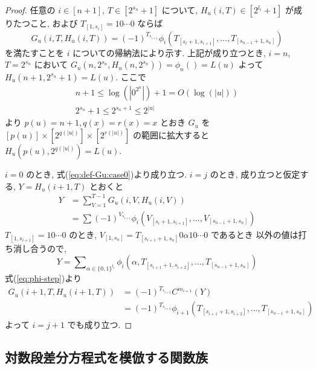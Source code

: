 \begin{proof}
 任意の $i \in [n+1]$, $T \in [2^{s_n}+1]$ について,
 $H_u(i,T) \in [2^{l_i}+1]$ が成りたつこと,
 および $T_{[1,s_i]} = 10 \cdots 0$ ならば
 \begin{equation} \label{eq:subformula}
  G_u(i,T,H_u(i,T)) = (-1)^{T_{s_{i+1}}} 
   \phi_i(T_{[s_i+1, s_{i+1}]}, \dots, T_{[s_{n-1}+1, s_n]})
 \end{equation}
 を満たすことを $i$ についての帰納法により示す.
 上記が成り立つとき,
 $i=n$, $T=2^{s_n}$ において $G_u(n, 2^{s_n}, H_u(n,2^{s_n})) = \phi_n() = L(u)$
 よって $H_u(n+1, 2^{s_n}+1) = L(u)$.
 ここで 
 \begin{gather}
  n+1 \le \log(|0^{2^n}|) + 1 = O(\log(|u|)) \\
  2^{s_n}+1 \le 2^{s_n+1} \le 2^{|u|}
 \end{gather}
 より $p(u) = n+1, q(x) = r(x) = x$ とおき $G_u$ を
 $[p(u)] \times [2^{q(|u|)}] \times [2^{r(|u|)}]$ の範囲に拡大すると
 $H_u(p(u), 2^{q(|u|)}) = L(u)$.

 $i=0$ のとき, 式(\ref{eq:def-Gu:case0})より成り立つ.
 $i=j$ のとき, 成り立つと仮定する, $Y = H_u(i+1, T)$ とおくと
 \begin{align}
  Y 
  &= \sum_{V = 1}^{T-1} G_u(i, V, H_u(i, V)) \\
  &= \sum (-1)^{V_{s_{i+1}}} \phi_i(V_{[s_i+1, s_{i+1}]}, 
   \dots, V_{[s_{n-1}+1, s_n]})
 \end{align}
 $T_{[1, s_{i+1}]} = 10 \cdots 0$ のとき,
 $V_{[1, s_n]} = T_{[s_{i+1}+1,s_n]} 0 \alpha 1 0 \cdots 0$ であるとき
 以外の値は打ち消し合うので,
 \begin{equation}
  Y = \sum\nolimits_{\alpha \in \{0,1\}^{l_i}} 
  \phi_i(\alpha, T_{[s_{i+1}+1, s_{i+2}]}, \dots, T_{[s_{n-1}+1, s_n]})
 \end{equation}
 式(\ref{eq:phi-step})より
 \begin{align}
  G_u(i+1,T,H_u(i+1,T)) 
  &= (-1)^{T_{s_{i+2}}} C^{m_{i+1}} (Y)\\
  &= (-1)^{T_{s_{i+2}}} \phi_{i+1}(T_{[s_{i+1}+1, s_{i+2}]}, \dots, T_{[s_{n-1}+1, s_n]})
 \end{align}
 よって $i=j+1$ でも成り立つ.
 \end{proof}


\subsection{対数段差分方程式を模倣する関数族}

